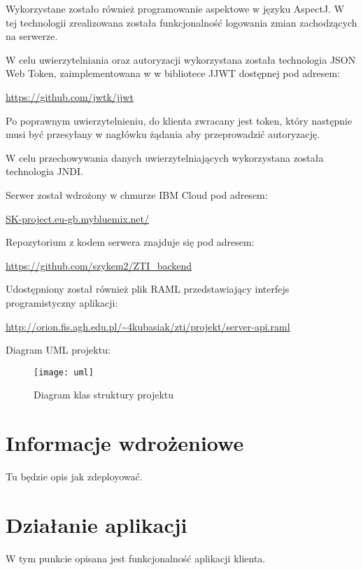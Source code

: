 \documentclass[11pt, titlepage]{article}
\begin{document}
Wykorzystane zostało również programowanie aspektowe w języku AspectJ. W tej technologii zrealizowana została funkcjonalność logowania zmian zachodzących na serwerze.

W celu uwierzytelniania oraz autoryzacji wykorzystana została technologia JSON Web Token, zaimplementowana w w bibliotece JJWT dostępnej pod adresem:
\begin{center}
\url{https://github.com/jwtk/jjwt}
\end{center}

Po poprawnym uwierzytelnieniu, do klienta zwracany jest token, który następnie musi być przesyłany w nagłówku żądania aby przeprowadzić autoryzację.

W celu przechowywania danych uwierzytelniających wykorzystana została technologia JNDI.

Serwer został wdrożony w chmurze IBM Cloud pod adresem:
\begin{center}
\url{SK-project.eu-gb.mybluemix.net/}
\end{center}

Repozytorium z kodem serwera znajduje się pod adresem:
\begin{center}
\url{https://github.com/szykem2/ZTI_backend}
\end{center}

Udostępniony został również plik RAML przedstawiający interfejs programistyczny aplikacji:
\begin{center}
\begin{adjustwidth}{-0.0cm}{}
\url{http://orion.fis.agh.edu.pl/~4kubasiak/zti/projekt/server-api.raml}
\end{adjustwidth}
\end{center}


\break

Diagram UML projektu:
\begin{figure}[H]
\caption{Diagram klas struktury projektu}
\begin{adjustwidth}{-3cm}{}
\texttt{[image: uml]}
\end{adjustwidth}
\end{figure}

\section{Informacje wdrożeniowe}

\hspace{11pt} Tu będzie opis jak zdeployować.

\section{Działanie aplikacji}
\hspace{11pt} W tym punkcie opisana jest funkcjonalność aplikacji klienta. 
\end{document}
